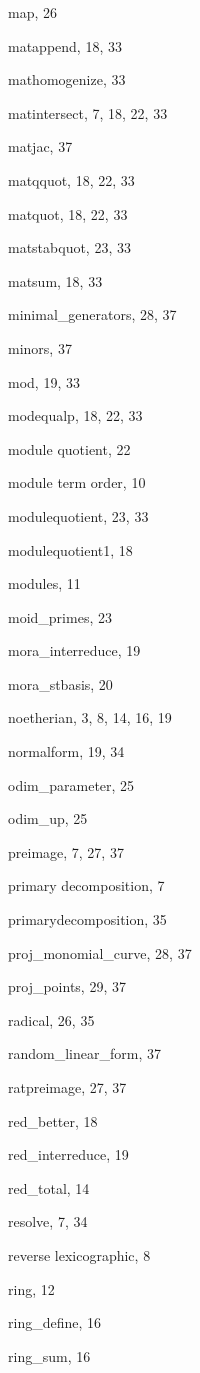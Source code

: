 \begin{theindex}
  \item map, 26
  \item matappend, 18, 33
  \item mathomogenize, 33
  \item matintersect, 7, 18, 22, 33
  \item matjac, 37
  \item matqquot, 18, 22, 33
  \item matquot, 18, 22, 33
  \item matstabquot, 23, 33
  \item matsum, 18, 33
  \item minimal\_generators, 28, 37
  \item minors, 37
  \item mod, 19, 33
  \item modequalp, 18, 22, 33
  \item module quotient, 22
  \item module term order, 10
  \item modulequotient, 23, 33
  \item modulequotient1, 18
  \item modules, 11
  \item moid\_primes, 23
  \item mora\_interreduce, 19
  \item mora\_stbasis, 20

  \indexspace

  \item noetherian, 3, 8, 14, 16, 19
  \item normalform, 19, 34

  \indexspace

  \item odim\_parameter, 25
  \item odim\_up, 25

  \indexspace

  \item preimage, 7, 27, 37
  \item primary decomposition, 7
  \item primarydecomposition, 35
  \item proj\_monomial\_curve, 28, 37
  \item proj\_points, 29, 37

  \indexspace

  \item radical, 26, 35
  \item random\_linear\_form, 37
  \item ratpreimage, 27, 37
  \item red\_better, 18
  \item red\_interreduce, 19
  \item red\_total, 14
  \item resolve, 7, 34
  \item reverse lexicographic, 8
  \item ring, 12
  \item ring\_define, 16
  \item ring\_sum, 16


\end{theindex}
